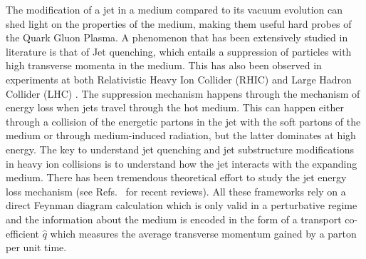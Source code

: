 \documentclass[letter,11pt]{article}
\begin{document}
The modification of a jet in a medium compared to its vacuum evolution can shed light on the properties of the medium, making them useful hard probes of the Quark Gluon Plasma. A phenomenon that has been extensively studied in  literature\cite{Gyulassy:1993hr,Wang:1994fx,Baier:1994bd,Baier:1996kr,Baier:1996sk,Zakharov:1996fv,Zakharov:1997uu,Gyulassy:1999zd,Gyulassy:2000er,Wiedemann:2000za,Guo:2000nz,Wang:2001ifa,Arnold:2002ja,Arnold:2002zm,Salgado:2003gb,Armesto:2003jh,Majumder:2006wi,Majumder:2007zh,Neufeld:2008fi,Neufeld:2009ep} is that of Jet quenching, which entails a suppression of particles with high transverse momenta in the medium. This has also been observed in experiments at both Relativistic Heavy Ion Collider (RHIC) \cite{Arsene:2004fa,Back:2004je,Adams:2005dq,Adcox:2004mh} and Large Hadron Collider (LHC) \cite{Aad:2010bu,Aamodt:2010jd,Chatrchyan:2011sx}. The suppression mechanism happens through the mechanism of energy loss when jets travel through the hot medium. This can happen either through a collision of the energetic partons in the jet with the soft partons of the medium or through medium-induced radiation, but the latter dominates at high energy. The key to understand jet quenching and jet substructure modifications in heavy ion collisions is to understand how the jet interacts with the expanding medium. There has been tremendous theoretical effort to study the jet energy loss mechanism (see Refs.~\cite{Mehtar-Tani:2013pia,Blaizot:2015lma,Qin:2015srf,Cao:2020wlm} for recent reviews). All these frameworks rely on a direct Feynman diagram calculation which is only valid in a perturbative regime and the information about the medium is encoded in the form of a transport co-efficient $\hat q$ which measures the average transverse momentum gained by a parton per unit time. 
\end{document}

